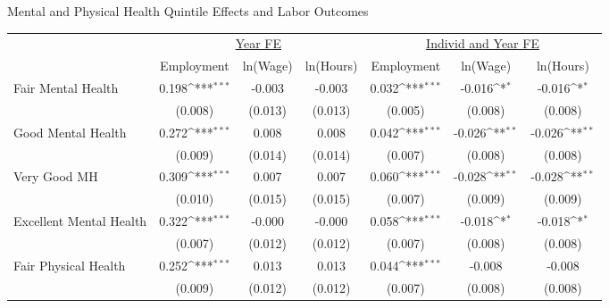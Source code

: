 \def\sym#1{\ifmmode^{#1}\else\(^{#1}\)\fi}
\caption{Mental and Physical Health Quintile Effects and Labor Outcomes}
\footnotesize\begin{tabular}{l*{6}{c}}
                    &\multicolumn{3}{c}{\underline{Year FE}}                          &\multicolumn{3}{c}{\underline{Individ and Year FE}}              \\\cmidrule(lr){2-4}\cmidrule(lr){5-7}
                    &\multicolumn{1}{c}{Employment}&\multicolumn{1}{c}{ln(Wage)}&\multicolumn{1}{c}{ln(Hours)}&\multicolumn{1}{c}{Employment}&\multicolumn{1}{c}{ln(Wage)}&\multicolumn{1}{c}{ln(Hours)}\\
\hline
Fair Mental Health  &       0.198\sym{***}&      -0.003         &      -0.003         &       0.032\sym{***}&      -0.016\sym{*}  &      -0.016\sym{*}  \\
                    &     (0.008)         &     (0.013)         &     (0.013)         &     (0.005)         &     (0.008)         &     (0.008)         \\
Good Mental Health  &       0.272\sym{***}&       0.008         &       0.008         &       0.042\sym{***}&      -0.026\sym{**} &      -0.026\sym{**} \\
                    &     (0.009)         &     (0.014)         &     (0.014)         &     (0.007)         &     (0.008)         &     (0.008)         \\
Very Good MH        &       0.309\sym{***}&       0.007         &       0.007         &       0.060\sym{***}&      -0.028\sym{**} &      -0.028\sym{**} \\
                    &     (0.010)         &     (0.015)         &     (0.015)         &     (0.007)         &     (0.009)         &     (0.009)         \\
Excellent Mental Health&       0.322\sym{***}&      -0.000         &      -0.000         &       0.058\sym{***}&      -0.018\sym{*}  &      -0.018\sym{*}  \\
                    &     (0.007)         &     (0.012)         &     (0.012)         &     (0.007)         &     (0.008)         &     (0.008)         \\
Fair Physical Health&       0.252\sym{***}&       0.013         &       0.013         &       0.044\sym{***}&      -0.008         &      -0.008         \\
                    &     (0.009)         &     (0.012)         &     (0.012)         &     (0.007)         &     (0.008)         &     (0.008)         \\

\end{tabular}
